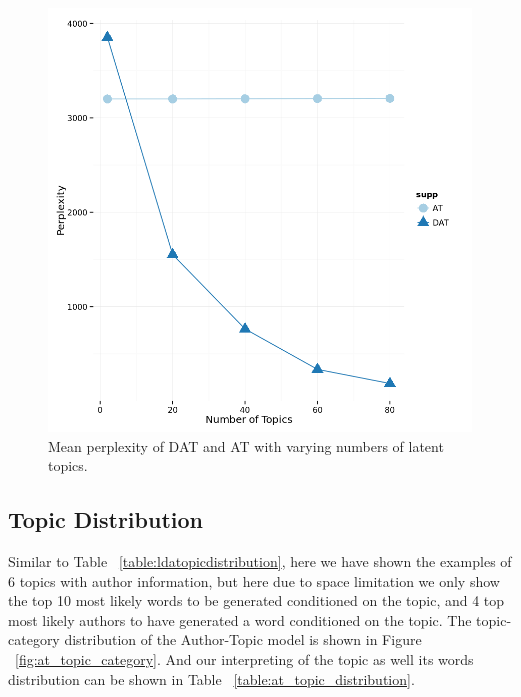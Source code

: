 \begin{figure}[h]
\centering
\includegraphics[width=1\textwidth]{figures/at_dat_perplexity.png}
\caption{Mean perplexity of DAT and AT with varying numbers of latent topics.}
\label{fig:at_dat_perplexity}
\end{figure}

\subsection{Topic Distribution}


Similar to Table ~\ref{table:ldatopicdistribution}, here we have shown the examples of 6 topics with author information, but here due to space limitation we only show the top 10 most likely words to be generated conditioned on the topic, and 4 top most likely authors to have generated a word conditioned on the topic. The topic-category distribution of the Author-Topic model is shown in Figure ~\ref{fig:at_topic_category}. And our interpreting of the topic as well its words distribution can be shown in Table ~\ref{table:at_topic_distribution}. 

